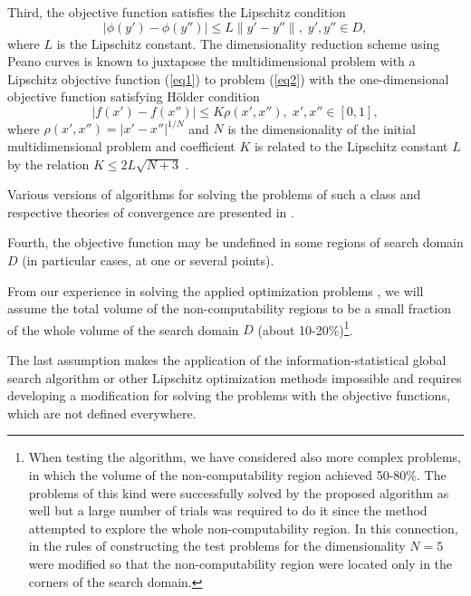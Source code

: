 \documentclass[runningheads]{llncs}
\begin{document}
Third, the objective function satisfies the Lipschitz condition
\begin{equation}\label{eq3} 
| \phi (y')-\phi (y'') | \leq L \| y'-y'' \|, \; y',y'' \in D,
\end{equation}
where $L$ is the Lipschitz constant. The dimensionality reduction scheme using Peano curves is known to juxtapose the multidimensional problem with a Lipschitz objective function (\ref{eq1}) to problem (\ref{eq2}) with the one-dimensional objective function satisfying H{\"o}lder condition
\begin{equation}\label{eq4} 
| f(x')-f(x'') | \leq K \rho(x',x''), \; x',x'' \in [0,1],
\end{equation}
where $\rho(x',x'') =  |x' - x''|^{1/N}$ and $N$ is the dimensionality of the initial multidimensional problem and coefficient $K$ is related to the Lipschitz constant $L$ by the relation $K \leq 2L\sqrt {N+3}$ \cite{Strongin2000}.

Various versions of algorithms for solving the problems of such a class and respective theories of convergence are presented in \cite{Sergeyev2013,Strongin2000}.

Fourth, the objective function may be undefined in some regions of search domain $D$ (in particular cases, at one or several points).

From our experience in solving the applied optimization problems \cite{Barkalov2022,Gubaydullin2022}, we will assume the total volume of the non-computability regions to be a small fraction of the whole volume of the search domain $D$ (about 10-20\%)\footnote{When testing the algorithm, we have considered also more complex problems, in which the volume of the non-computability region achieved 50-80\%. The problems of this kind were successfully solved by the proposed algorithm as well but a large number of trials was required to do it since the method attempted to explore the whole non-computability region. In this connection, in the rules of constructing the test problems for the dimensionality $N=5$ were modified so that the non-computability region were located only in the corners of the search domain.}.

The last assumption makes the application of the information-statistical global search algorithm \cite{Strongin2000} or other Lipschitz optimization methods \cite{PaulaviciusZilinskas2014,Sergeyev2017} impossible and requires developing a modification for solving the problems with the objective functions, which are not defined everywhere.
\end{document}
